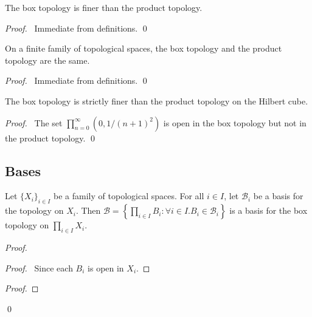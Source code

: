 \begin{prop}
The box topology is finer than the product topology.
\end{prop}

\begin{proof}
\pf\ Immediate from definitions. \qed
\end{proof}

\begin{prop}
On a finite family of topological spaces, the box topology and the product topology are the same.
\end{prop}

\begin{proof}
\pf\ Immediate from definitions. \qed
\end{proof}

\begin{prop}
The box topology is strictly finer than the product topology on the Hilbert cube.
\end{prop}

\begin{proof}
\pf\ The set $\prod_{n=0}^\infty (0, 1/(n+1)^2)$ is open in the box topology but not in the product topology. \qed
\end{proof}

\subsection{Bases}

\begin{prop}
Let $\{X_i\}_{i \in I}$ be a family of topological spaces. For all $i \in I$, let $\mathcal{B}_i$ be a basis for the topology on $X_i$. Then $\mathcal{B} = \left\{ \prod_{i \in I} B_i : \forall i \in I. B_i \in \mathcal{B}_i \right\}$ is a basis for the box topology on $\prod_{i \in I} X_i$.
\end{prop}

\begin{proof}
\pf
{}
\begin{proof}
	\pf\ Since each $B_i$ is open in $X_i$.
\end{proof}
\begin{proof}
\end{proof}
\qed
\end{proof}

